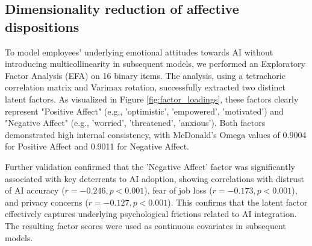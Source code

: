 \documentclass[]{article}
\begin{document}
\begin{table}[t]
\centering
\caption{LCA Class Sizes and Conditional Response Probabilities for the 3-Class Solution.}
\label{tab:lca_probs}
\end{table}

\subsection{Dimensionality reduction of affective dispositions}
To model employees' underlying emotional attitudes towards AI without introducing multicollinearity in subsequent models, we performed an Exploratory Factor Analysis (EFA) on 16 binary items. The analysis, using a tetrachoric correlation matrix and Varimax rotation, successfully extracted two distinct latent factors. As visualized in Figure \ref{fig:factor_loadings}, these factors clearly represent "Positive Affect" (e.g., 'optimistic', 'empowered', 'motivated') and "Negative Affect" (e.g., 'worried', 'threatened', 'anxious'). Both factors demonstrated high internal consistency, with McDonald's Omega values of 0.9004 for Positive Affect and 0.9011 for Negative Affect.

Further validation confirmed that the 'Negative Affect' factor was significantly associated with key deterrents to AI adoption, showing correlations with distrust of AI accuracy ($r = -0.246, p < 0.001$), fear of job loss ($r = -0.173, p < 0.001$), and privacy concerns ($r = -0.127, p < 0.001$). This confirms that the latent factor effectively captures underlying psychological frictions related to AI integration. The resulting factor scores were used as continuous covariates in subsequent models.
\end{document}
